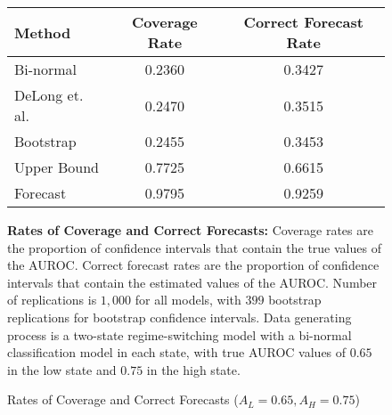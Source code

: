 


\begin{figure}[h!]

\begin{center}

    \caption{Rates of Coverage and Correct Forecasts ($A_L = 0.65, A_H = 0.75$)} \label{fig:Coverage1}

    \begin{tabular}{l c c }

    Method & Coverage Rate & Correct Forecast Rate \\

    \hline
    


          Bi-normal &  0.2360 & 0.3427 \\
     DeLong et. al. &  0.2470 & 0.3515 \\
          Bootstrap &  0.2455 & 0.3453 \\
        Upper Bound &  0.7725 & 0.6615 \\
           Forecast &  0.9795 & 0.9259 \\


    \hline

    \end{tabular}


\end{center}

    \footnotesize

        \textbf{Rates of Coverage and Correct Forecasts:}
        Coverage rates are the proportion of confidence intervals that contain the true values of the AUROC.
        Correct forecast rates are the proportion of confidence intervals that contain the estimated values of the AUROC.
        Number of replications is $1,000$ for all models, with $399$ bootstrap replications for bootstrap confidence intervals.
        Data generating process is a two-state regime-switching model with a bi-normal classification model in each state,
        with true AUROC values of $0.65$ in the low state and $0.75$ in the high state.





\end{figure}



